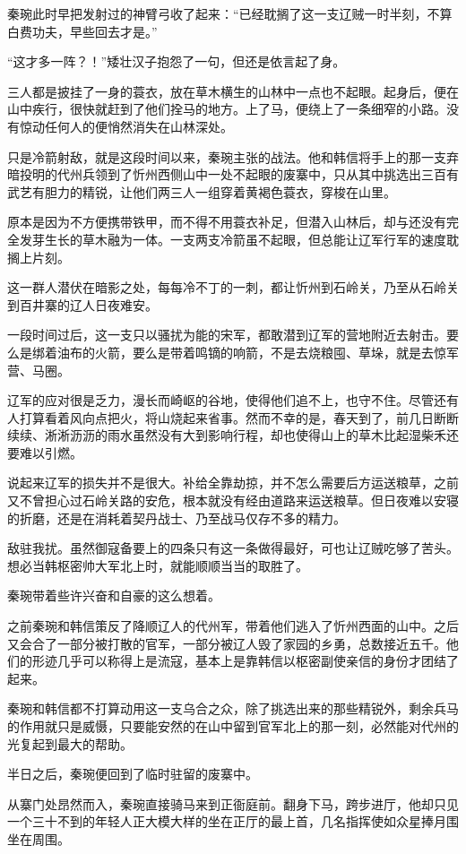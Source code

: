秦琬此时早把发射过的神臂弓收了起来：“已经耽搁了这一支辽贼一时半刻，不算白费功夫，早些回去才是。”

“这才多一阵？！”矮壮汉子抱怨了一句，但还是依言起了身。

三人都是披挂了一身的蓑衣，放在草木横生的山林中一点也不起眼。起身后，便在山中疾行，很快就赶到了他们拴马的地方。上了马，便绕上了一条细窄的小路。没有惊动任何人的便悄然消失在山林深处。

只是冷箭射敌，就是这段时间以来，秦琬主张的战法。他和韩信将手上的那一支弃暗投明的代州兵领到了忻州西侧山中一处不起眼的废寨中，只从其中挑选出三百有武艺有胆力的精锐，让他们两三人一组穿着黄褐色蓑衣，穿梭在山里。

原本是因为不方便携带铁甲，而不得不用蓑衣补足，但潜入山林后，却与还没有完全发芽生长的草木融为一体。一支两支冷箭虽不起眼，但总能让辽军行军的速度耽搁上片刻。

这一群人潜伏在暗影之处，每每冷不丁的一刺，都让忻州到石岭关，乃至从石岭关到百井寨的辽人日夜难安。

一段时间过后，这一支只以骚扰为能的宋军，都敢潜到辽军的营地附近去射击。要么是绑着油布的火箭，要么是带着鸣镝的响箭，不是去烧粮囤、草垛，就是去惊军营、马圈。

辽军的应对很是乏力，漫长而崎岖的谷地，使得他们追不上，也守不住。尽管还有人打算看着风向点把火，将山烧起来省事。然而不幸的是，春天到了，前几日断断续续、淅淅沥沥的雨水虽然没有大到影响行程，却也使得山上的草木比起湿柴禾还要难以引燃。

说起来辽军的损失并不是很大。补给全靠劫掠，并不怎么需要后方运送粮草，之前又不曾担心过石岭关路的安危，根本就没有经由道路来运送粮草。但日夜难以安寝的折磨，还是在消耗着契丹战士、乃至战马仅存不多的精力。

敌驻我扰。虽然御寇备要上的四条只有这一条做得最好，可也让辽贼吃够了苦头。想必当韩枢密帅大军北上时，就能顺顺当当的取胜了。

秦琬带着些许兴奋和自豪的这么想着。

之前秦琬和韩信策反了降顺辽人的代州军，带着他们逃入了忻州西面的山中。之后又会合了一部分被打散的官军，一部分被辽人毁了家园的乡勇，总数接近五千。他们的形迹几乎可以称得上是流寇，基本上是靠韩信以枢密副使亲信的身份才团结了起来。

秦琬和韩信都不打算动用这一支乌合之众，除了挑选出来的那些精锐外，剩余兵马的作用就只是威慑，只要能安然的在山中留到官军北上的那一刻，必然能对代州的光复起到最大的帮助。

半日之后，秦琬便回到了临时驻留的废寨中。

从寨门处昂然而入，秦琬直接骑马来到正衙庭前。翻身下马，跨步进厅，他却只见一个三十不到的年轻人正大模大样的坐在正厅的最上首，几名指挥使如众星捧月围坐在周围。

